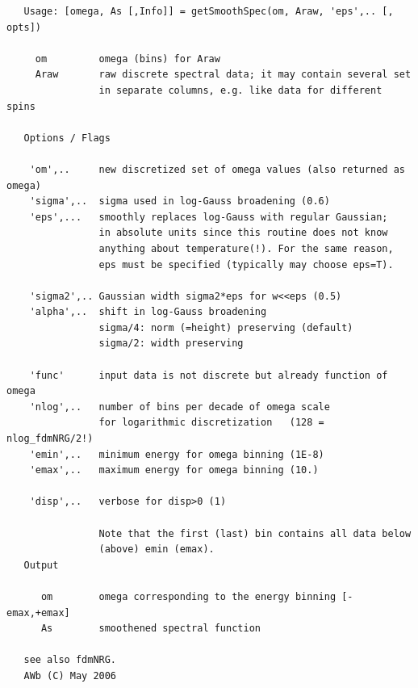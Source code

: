 \documentclass[twoside,12pt]{article}
\begin{document}
\begin{verbatim}
   Usage: [omega, As [,Info]] = getSmoothSpec(om, Araw, 'eps',.. [, opts])
 
     om         omega (bins) for Araw
     Araw       raw discrete spectral data; it may contain several set
                in separate columns, e.g. like data for different spins
 
   Options / Flags
 
    'om',..     new discretized set of omega values (also returned as omega)
    'sigma',..  sigma used in log-Gauss broadening (0.6)
    'eps',...   smoothly replaces log-Gauss with regular Gaussian;
                in absolute units since this routine does not know
                anything about temperature(!). For the same reason,
                eps must be specified (typically may choose eps=T).
 
    'sigma2',.. Gaussian width sigma2*eps for w<<eps (0.5)
    'alpha',..  shift in log-Gauss broadening
                sigma/4: norm (=height) preserving (default)
                sigma/2: width preserving
 
    'func'      input data is not discrete but already function of omega
    'nlog',..   number of bins per decade of omega scale
                for logarithmic discretization   (128 = nlog_fdmNRG/2!)
    'emin',..   minimum energy for omega binning (1E-8)
    'emax',..   maximum energy for omega binning (10.)
 
    'disp',..   verbose for disp>0 (1)
 
                Note that the first (last) bin contains all data below
                (above) emin (emax).
   Output
 
      om        omega corresponding to the energy binning [-emax,+emax]
      As        smoothened spectral function
 
   see also fdmNRG.
   AWb (C) May 2006
\end{verbatim}

\pagebreak[3]


\end{document}
